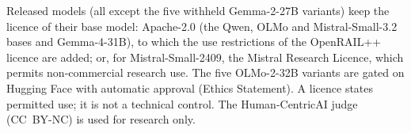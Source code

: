 
Released models (all except the five withheld Gemma-2-27B variants) keep the
licence of their base model: Apache-2.0 (the Qwen,
OLMo and Mistral-Small-3.2 bases and Gemma-4-31B), to which the use
restrictions of the OpenRAIL++ licence are added; or, for
Mistral-Small-2409, the Mistral Research Licence, which permits
non-commercial research use. The five OLMo-2-32B variants are gated
on Hugging Face with automatic approval (Ethics Statement). A licence states
permitted use; it is not a technical control. The Human-CentricAI judge
(CC~BY-NC) is used for research only.

